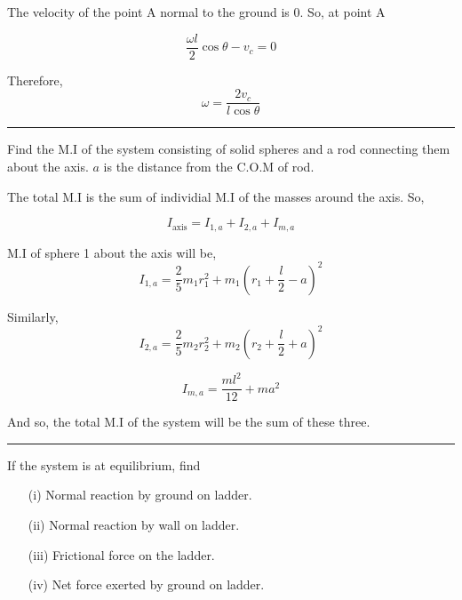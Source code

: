 \documentclass[twocolumn]{article}
\begin{document}
\begin{CJK*}{UTF8}{gbsn}
The velocity of the point A normal to the ground is 0. So, at point A

\[
    \frac{\omega l}{2} \cos \theta - v_c = 0
\]

Therefore, 
\[
    \boxed{\omega = \frac{2v_c}{l \cos \theta }}
\]

\vspace{0.1in}
\hrule

\begin{question}
    Find the M.I of the system consisting of solid spheres and a rod connecting them about the axis. \(a\) is the distance from the C.O.M of rod. 
    \begin{center}
    \end{center}
\end{question}

The total M.I is the sum of individial M.I of the masses around the axis. So, 

\[
    I_{\text{axis} } = I_{1,a} + I_{2,a} + I_{m,a} 
\]

M.I of sphere 1 about the axis will be, 
\[
    I_{1,a} = \frac{2}{5}m_1 r_{1}^{2} + m_1 (r_1 + \frac{l}{2} - a)^{2} 
\]

Similarly, 
\[
    I_{2,a} = \frac{2}{5}m_2 r_{2}^{2} + m_2 (r_2 + \frac{l}{2} + a)^{2}
\]

\[
    I_{m,a} = \frac{ml^{2}}{12} + ma^{2} 
\]

And so, the total M.I of the system will be the sum of these three. 

\vspace{0.1in}
\hrule 

\begin{question}
    If the system is at equilibrium, find 
    \begin{itemize}
        \item[(i)] Normal reaction by ground on ladder. 
        \item[(ii)] Normal reaction by wall on ladder. 
        \item[(iii)] Frictional force on the ladder. 
        \item[(iv)] Net force exerted by ground on ladder.    
    \end{itemize}
    \begin{center}
        \begin{tikzpicture}[scale=1]


\end{tikzpicture}
\end{center}
\end{question}
\end{CJK*}
\end{document}
